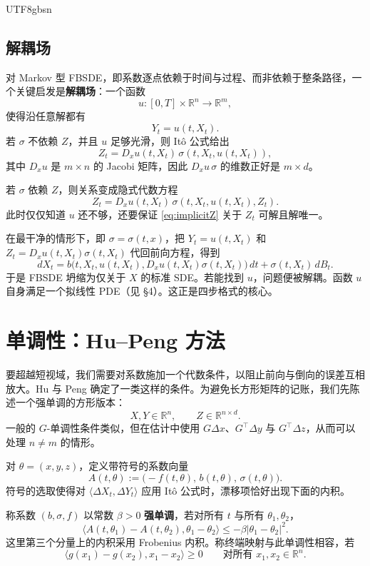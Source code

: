 \documentclass{article}
\theoremstyle{plain}
\theoremstyle{definition}
\theoremstyle{remark}
\numberwithin{equation}{section}
\newcommand{\R}{\mathbb{R}}
\begin{document}
\begin{CJK*}{UTF8}{gbsn}
\subsection{解耦场}

对 Markov 型 FBSDE，即系数逐点依赖于时间与过程、而非依赖于整条路径，一个关键启发是\textbf{解耦场}：一个函数
\[
  u:[0,T]\times\R^n\to\R^m,
\]
使得沿任意解都有
\[
  Y_t=u(t,X_t).
\]
若 $\sigma$ 不依赖 $Z$，并且 $u$ 足够光滑，则 It\^o 公式给出
\[
  Z_t=D_xu(t,X_t)\,\sigma(t,X_t,u(t,X_t)),
\]
其中 $D_xu$ 是 $m\times n$ 的 Jacobi 矩阵，因此 $D_xu\,\sigma$ 的维数正好是 $m\times d$。

若 $\sigma$ 依赖 $Z$，则关系变成隐式代数方程
\begin{equation}\label{eq:implicitZ}
  Z_t=D_xu(t,X_t)\,\sigma(t,X_t,u(t,X_t),Z_t).
\end{equation}
此时仅仅知道 $u$ 还不够，还要保证 \eqref{eq:implicitZ} 关于 $Z_t$ 可解且解唯一。

在最干净的情形下，即 $\sigma=\sigma(t,x)$，把 $Y_t=u(t,X_t)$ 和 $Z_t=D_xu(t,X_t)\sigma(t,X_t)$ 代回前向方程，得到
\[
  dX_t=b\bigl(t,X_t,u(t,X_t),D_xu(t,X_t)\sigma(t,X_t)\bigr)\,dt+\sigma(t,X_t)\,dB_t.
\]
于是 FBSDE 坍缩为仅关于 $X$ 的标准 SDE。若能找到 $u$，问题便被解耦。函数 $u$ 自身满足一个拟线性 PDE（见 \S4）。这正是四步格式的核心。

\section{单调性：Hu--Peng 方法}

要超越短视域，我们需要对系数施加一个代数条件，以阻止前向与倒向的误差互相放大。Hu 与 Peng 确定了一类这样的条件。为避免长方形矩阵的记账，我们先陈述一个强单调的方形版本：
\[
  X,Y\in\R^n,\qquad Z\in\R^{n\times d}.
\]
一般的 $G$-单调性条件类似，但在估计中使用 $G\Delta x$、$G^\top\Delta y$ 与 $G^\top\Delta z$，从而可以处理 $n\ne m$ 的情形。

对 $\theta=(x,y,z)$，定义带符号的系数向量
\[
  A(t,\theta):=\bigl(-f(t,\theta),\,b(t,\theta),\,\sigma(t,\theta)\bigr).
\]
符号的选取使得对 $\langle \Delta X_t,\Delta Y_t\rangle$ 应用 It\^o 公式时，漂移项恰好出现下面的内积。

\begin{definition}[强单调性]\label{def:monotone}
称系数 $(b,\sigma,f)$ 以常数 $\beta>0$ \textbf{强单调}，若对所有 $t$ 与所有 $\theta_1,\theta_2$，
\begin{equation}\label{eq:monotone}
  \bigl\langle A(t,\theta_1)-A(t,\theta_2),\theta_1-\theta_2\bigr\rangle\le-\beta |\theta_1-\theta_2|^2.
\end{equation}
这里第三个分量上的内积采用 Frobenius 内积。称终端映射与此单调性相容，若
\begin{equation}\label{eq:terminal}
  \langle g(x_1)-g(x_2),x_1-x_2\rangle\ge 0\qquad\text{对所有 }x_1,x_2\in\R^n.
\end{equation}
\end{definition}


\end{CJK*}
\end{document}
